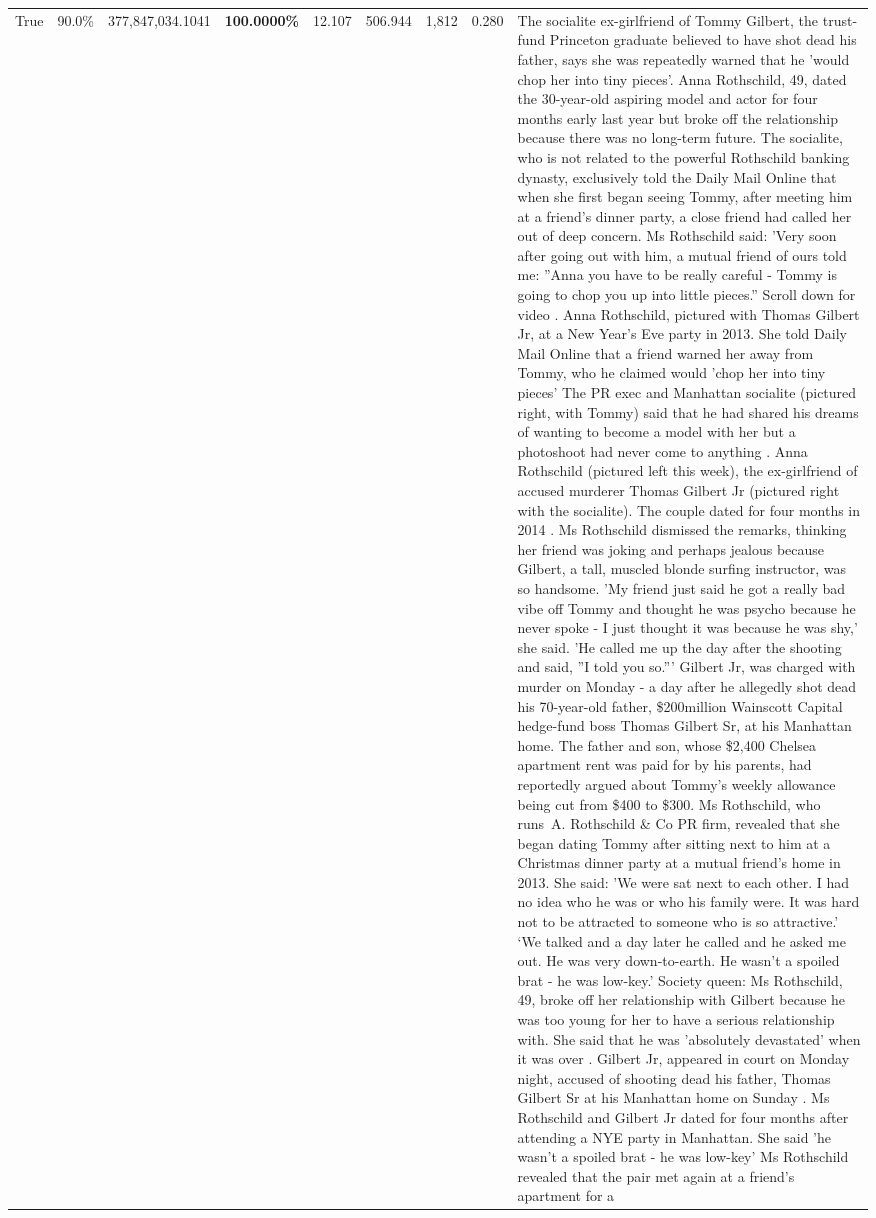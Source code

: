 \begin{table}[H]
\begin{tabular}{lllrlllll}
True & 90.0\% & 377,847,034.1041 & \bfseries \color{red} 100.0000\% & 12.107 & 506.944 & 1,812 & 0.280 & The socialite ex-girlfriend of Tommy Gilbert, the trust-fund Princeton graduate believed to have shot dead his father, says she was repeatedly warned that he 'would chop her into tiny pieces'. Anna Rothschild, 49, dated the 30-year-old aspiring model and actor for four months early last year but broke off the relationship because there was no long-term future. The socialite, who is not related to the powerful Rothschild banking dynasty, exclusively told the Daily Mail Online that when she first began seeing Tommy, after meeting him at a friend's dinner party, a close friend had called her out of deep concern. Ms Rothschild said: 'Very soon after going out with him, a mutual friend of ours told me: ''Anna you have to be really careful - Tommy is going to chop you up into little pieces.'' Scroll down for video . Anna Rothschild, pictured with Thomas Gilbert Jr, at a New Year's Eve party in 2013. She told Daily Mail Online that a friend warned her away from Tommy, who he claimed would 'chop her into tiny pieces' The PR exec and Manhattan socialite (pictured right, with Tommy) said that he had shared his dreams of wanting to become a model with her but a photoshoot had never come to anything . Anna Rothschild (pictured left this week), the ex-girlfriend of accused murderer Thomas Gilbert Jr (pictured right with the socialite). The couple dated for four months in 2014 . Ms Rothschild dismissed the remarks, thinking her friend was joking and perhaps jealous because Gilbert, a tall, muscled blonde surfing instructor, was so handsome. 'My friend just said he got a really bad vibe off Tommy and thought he was psycho because he never spoke - I just thought it was because he was shy,' she said. 'He called me up the day after the shooting and said, ''I told you so.''' Gilbert Jr, was charged with murder on Monday - a day after he allegedly shot dead his 70-year-old father, \$200million Wainscott Capital hedge-fund boss Thomas Gilbert Sr, at his Manhattan home. The father and son, whose \$2,400 Chelsea apartment rent was paid for by his parents, had reportedly argued about Tommy's weekly allowance being cut from \$400 to \$300. Ms Rothschild, who runs A. Rothschild \& Co PR firm, revealed that she began dating Tommy after sitting next to him at a Christmas dinner party at a mutual friend's home in 2013. She said: 'We were sat next to each other. I had no idea who he was or who his family were. It was hard not to be attracted to someone who is so attractive.' ‘We talked and a day later he called and he asked me out. He was very down-to-earth. He wasn’t a spoiled brat - he was low-key.’ Society queen: Ms Rothschild, 49, broke off her relationship with Gilbert because he was too young for her to have a serious relationship with. She said that he was 'absolutely devastated' when it was over . Gilbert Jr, appeared in court on Monday night, accused of shooting dead his father, Thomas Gilbert Sr at his Manhattan home on Sunday . Ms Rothschild and Gilbert Jr dated for four months after attending a NYE party in Manhattan. She said 'he wasn't a spoiled brat - he was low-key' Ms Rothschild revealed that the pair met again at a friend’s apartment for a 
\end{tabular}
\end{table}
